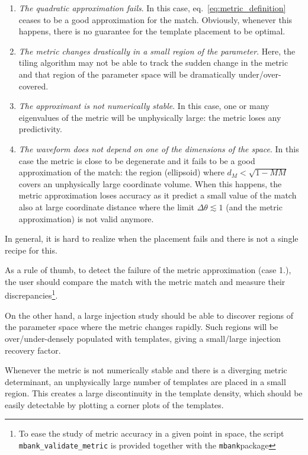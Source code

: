 \documentclass[twocolumn,showpacs,preprintnumbers,nofootinbib,prd,
superscriptaddress,10pt]{revtex4-2}
\newcommand{\mbank}{\texttt{mbank}}
\begin{document}
\begin{enumerate}
	\item {\it The quadratic approximation fails}. In this case, eq.~\eqref{eq:metric_definition} ceases to be a good approximation for the match. Obviously, whenever this happens, there is no guarantee for the template placement to be optimal.
	\item {\it The metric changes drastically in a small region of the parameter}. Here, the tiling algorithm may not be able to track the sudden change in the metric and that region of the parameter space will be dramatically under/over-covered.
	\item {\it The approximant is not numerically stable}. In this case, one or many eigenvalues of the metric will be unphysically large: the metric loses any predictivity.
	\item {\it The waveform does not depend on one of the dimensions of the space}. In this case the metric is close to be degenerate and it fails to be a good approximation of the match: the region (ellipsoid) where $d_M<\sqrt{1-MM}$ covers an unphysically large coordinate volume. When this happens, the metric approximation loses accuracy as it predict a small value of the match also at large coordinate distance where the limit $\Delta\theta \lesssim 1$ (and the metric approximation) is not valid anymore.
\end{enumerate}

In general, it is hard to realize when the placement fails and there is not a single recipe for this.

As a rule of thumb, to detect the failure of the metric approximation (case 1.), the user should compare the match with the metric match and measure their discrepancies\footnote{To ease the study of metric accuracy in a given point in space, the script \texttt{mbank\_validate\_metric} is provided together with the \mbank package}.

On the other hand, a large injection study should be able to discover regions of the parameter space where the metric changes rapidly. Such regions will be over/under-densely populated with templates, giving a small/large injection recovery factor.

Whenever the metric is not numerically stable and there is a diverging metric determinant, an unphysically large number of templates are placed in a small region. This creates a large discontinuity in the template density, which should be easily detectable by plotting a corner plots of the templates.
\end{document}
